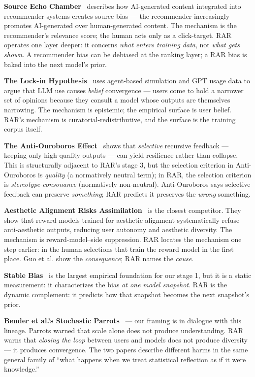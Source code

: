 \documentclass[sigconf,nonacm]{acmart}
\begin{document}
\textbf{Source Echo Chamber}~\cite{zhou2024source} describes how AI-generated content integrated into recommender systems creates source bias --- the recommender increasingly promotes AI-generated over human-generated content. The mechanism is the recommender's relevance score; the human acts only as a click-target. RAR operates one layer deeper: it concerns \emph{what enters training data}, not \emph{what gets shown}. A recommender bias can be debiased at the ranking layer; a RAR bias is baked into the next model's prior.

\textbf{The Lock-in Hypothesis}~\cite{qiu2025lockin} uses agent-based simulation and GPT usage data to argue that LLM use causes \emph{belief} convergence --- users come to hold a narrower set of opinions because they consult a model whose outputs are themselves narrowing. The mechanism is epistemic; the empirical surface is user belief. RAR's mechanism is curatorial-redistributive, and the surface is the training corpus itself.

\textbf{The Anti-Ouroboros Effect}~\cite{adapala2025antiouroboros} shows that \emph{selective} recursive feedback --- keeping only high-quality outputs --- can yield resilience rather than collapse. This is structurally adjacent to RAR's stage 3, but the selection criterion in Anti-Ouroboros is \emph{quality} (a normatively neutral term); in RAR, the selection criterion is \emph{stereotype-consonance} (normatively non-neutral). Anti-Ouroboros says selective feedback can preserve \emph{something}; RAR predicts it preserves the \emph{wrong} something.

\textbf{Aesthetic Alignment Risks Assimilation}~\cite{guo2025aesthetic} is the closest competitor. They show that reward models trained for aesthetic alignment systematically refuse anti-aesthetic outputs, reducing user autonomy and aesthetic diversity. The mechanism is reward-model--side suppression. RAR locates the mechanism one step earlier: in the human selections that train the reward model in the first place. Guo et al. show the \emph{consequence}; RAR names the \emph{cause}.

\textbf{Stable Bias}~\cite{luccioni2023stable} is the largest empirical foundation for our stage 1, but it is a static measurement: it characterizes the bias \emph{at one model snapshot}. RAR is the dynamic complement: it predicts how that snapshot becomes the next snapshot's prior.

\textbf{Bender et al.'s Stochastic Parrots}~\cite{bender2021dangers} --- our framing is in dialogue with this lineage. Parrots warned that scale alone does not produce understanding. RAR warns that \emph{closing the loop} between users and models does not produce diversity --- it produces convergence. The two papers describe different harms in the same general family of ``what happens when we treat statistical reflection as if it were knowledge.''
\end{document}
